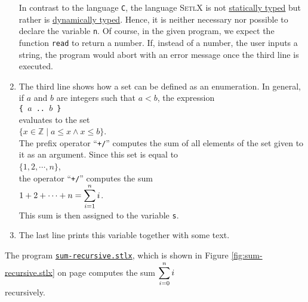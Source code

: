 \begin{enumerate}
      In contrast to the language \texttt{C}, the language \textsc{SetlX} is not
      \href{https://en.wikipedia.org/wiki/Type_system#STATIC}{statically typed} but rather is 
      \href{https://en.wikipedia.org/wiki/Type_system#DYNAMIC}{dynamically typed}.
      Hence, it is neither necessary nor possible to declare the variable \texttt{n}.
      Of course, in the given program, we expect the function \texttt{read} to return a number.
      If, instead of a number, the user inputs a string, the program would abort with an error
      message once the third line is executed.
\item The third line shows how a set can be defined as an enumeration.  In general, if 
      $a$ and $b$ are integers such that  $a < b$, the expression
      \\[0.2cm]
      \hspace*{1.3cm}
      \texttt{\{ $a$ .. $b$ \}}
      \\[0.2cm]
      evaluates to the set 
      \\[0.2cm]
      \hspace*{1.3cm}
      $\{ x \in \mathbb{Z} \mid a \leq x \wedge x \leq b \}$.
      \\[0.2cm]
      The prefix operator ``\texttt{+/}'' computes the sum of all elements of the set given to it as an
      argument.  Since this set is equal to
      \\[0.2cm]
      \hspace*{1.3cm}
      $\{ 1, 2, \cdots,  n \}$,
      \\[0.2cm]
      the operator ``\texttt{+/}'' computes the sum
      \\[0.2cm]
      \hspace*{1.3cm}
      $\displaystyle 1 + 2 + \cdots + n = \sum\limits_{i=1}^n i$.
      \\[0.2cm]
      This sum is then assigned to the variable \texttt{s}.
\item The last line prints this variable together with some text.
\end{enumerate}
The program
\href{https://github.com/karlstroetmann/Logik/blob/master/SetlX/sum-recursive.stlx}{\texttt{sum-recursive.stlx}},
which is shown in Figure \ref{fig:sum-recursive.stlx} on page \pageref{fig:sum-recursive.stlx}
computes the sum $\displaystyle\sum\limits_{i=0}^n i$ \\[-0.3cm]
recursively.


